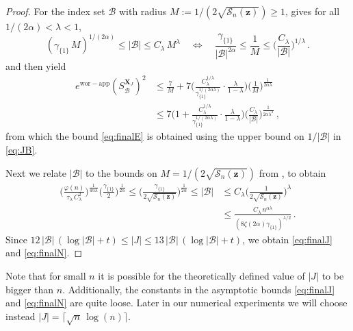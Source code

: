 \documentclass[a4paper]{amsart}
\newcommand{\bsz}{{\bm{z}}}
\newcommand{\calB}{{\mathcal{B}}}
\newcommand{\ewc}{e^{\mathrm{wor-app}}}
\begin{document}
\begin{proof} For the index set $\calB$ with radius $M := 1/(2\sqrt{\mathcal S_n(\bsz)})\ge 1$,  gives for all $1/(2\alpha) < \lambda < 1$,
    \begin{equation*}
        (\gamma_{\{1\}}\,M)^{1/(2\alpha)} \le |\calB| \le C_\lambda\,M^\lambda
      \quad\Leftrightarrow\quad
      \frac{\gamma_{\{1\}}}{|\calB|^{2\alpha} }
      \le \frac{1}{M} 
      \le \Big(\frac{C_\lambda}{|\calB|}\Big)^{1/\lambda}\,.
    \end{equation*}
     and  then yield
    \begin{align*}
        \ewc(S_{\mathcal B}^{\bm X_J})^2
        &\le \frac{7}{M} 
        +7\Big(
        \frac{ C_\lambda^{1/\lambda} }{ \gamma_{\{1\}}^{1/(2\alpha\lambda)} }
        \cdot
        \frac{\lambda }{1-\lambda}
        \Big)
        \Big(\frac{1}{M}\Big)^{\frac{1}{2\alpha\lambda}} \\
        &\le 7\Big(1+
        \frac{ C_\lambda^{1/\lambda} }{ \gamma_{\{1\}}^{1/(2\alpha\lambda)} }
        \cdot
        \frac{\lambda }{1-\lambda}
        \Big)
        \Big(\frac{C_\lambda}{|\calB|}\Big)^{\frac{1}{2\alpha\lambda^2}}\,,
    \end{align*}
    from which the bound \eqref{eq:finalE} is obtained using the upper bound on $1/|\calB|$ in \eqref{eq:JB}.

    Next we relate $|\calB|$ to the bounds on $M = 1/(2\sqrt{\mathcal S_n(\bm z)})$ from , to obtain
    \begin{align*}
        \Big(\frac{\varphi(n)}{\tau_\lambda\, C_\lambda^2}\Big)^{\frac{1}{4\alpha\lambda}}\Big(\frac{\gamma_{\{1\}}}{2}\Big)^{\frac{1}{2\alpha}}
        \le \Big(\frac{\gamma_{\{1\}}}{2\sqrt{\mathcal S_n(\bm z)}}\Big)^{\frac{1}{2\alpha}}
        \le |\mathcal B|
        &\le C_\lambda\Big(\frac{1}{2\sqrt{\mathcal S_n(\bm z)}}\Big)^\lambda \\
        &\le \frac{C_\lambda\,n^{\alpha\lambda}}{(8\zeta(2\alpha)\gamma_{\{1\}})^{\lambda/2}} \,.
    \end{align*}
    Since $12\,|\mathcal B|\,(\log|\mathcal B|+t) \le |J| \le 13\,|\mathcal B|\,(\log|\mathcal B| + t)$, we obtain \eqref{eq:finalJ} and \eqref{eq:finalN}.
\end{proof} 

Note that for small $n$ it is possible for the theoretically defined value of $|J|$ to be bigger than $n$. Additionally, the constants in the asymptotic bounds \eqref{eq:finalJ} and \eqref{eq:finalN} are quite loose. Later in our numerical experiments we will choose instead $|J| = \lceil\sqrt{n}\,\log(n)\rceil$.
\end{document}
